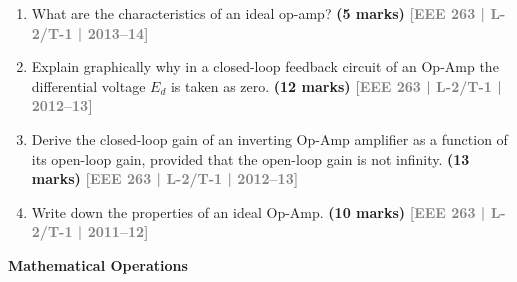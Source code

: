 \documentclass[12pt,a3paper]{article}
\newcommand{\yr}[1]{\hfill\textcolor{gray}{\small\textbf{[#1]}}}
\newcommand{\mk}[1]{\textcolor{orange!70!black}{\small\textbf{(#1 marks)}}}
\newcommand{\subtopic}[2]{%
  \vspace{10pt}
  \noindent\begin{tcolorbox}[colback=#1!8,colframe=#1,boxrule=0.6pt,arc=4pt,
    left=6pt,right=6pt,top=4pt,bottom=4pt]
    \small\bfseries\textcolor{#1}{#2}
  \end{tcolorbox}
  \vspace{2pt}
}
\begin{document}
\begin{enumerate}\item What are the characteristics of an ideal op-amp?
\mk{5} \yr{EEE 263 | L-2/T-1 | 2013--14}

\item Explain graphically why in a closed-loop feedback circuit of an Op-Amp the differential voltage $E_d$ is taken as zero.
\mk{12} \yr{EEE 263 | L-2/T-1 | 2012--13}

\item Derive the closed-loop gain of an inverting Op-Amp amplifier as a function of its open-loop gain, provided that the open-loop gain is not infinity.
\mk{13} \yr{EEE 263 | L-2/T-1 | 2012--13}

\item Write down the properties of an ideal Op-Amp.
\mk{10} \yr{EEE 263 | L-2/T-1 | 2011--12}

\end{enumerate}

\subtopic{cE}{Mathematical Operations}
\label{sub:s7-math}
\end{document}
